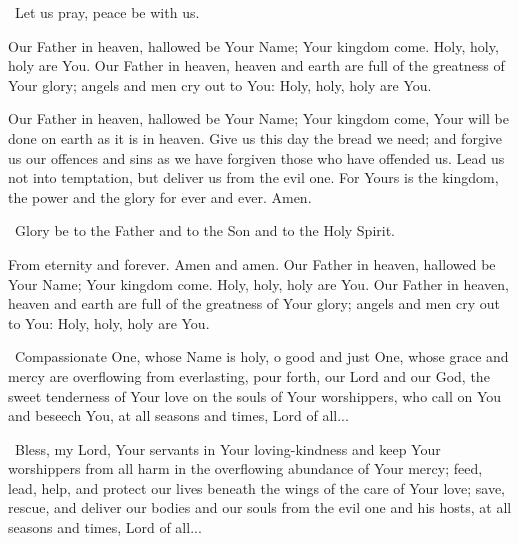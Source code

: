 \documentclass[12pt,twoside,a5paper]{article}
\begin{document}
\begin{halfparskip}
  \rr~Let us pray, peace be with us.


  Our Father in heaven, hallowed be Your Name; Your kingdom come. Holy, holy, holy are You. Our Father in heaven, heaven and earth are full of the greatness of Your glory; angels and men cry out to You: Holy, holy, holy are You.

  Our Father in heaven, hallowed be Your Name; Your kingdom come, Your will be done on earth as it is in heaven. Give us this day the bread we need; and forgive us our offences and sins as we have forgiven those who have offended us. Lead us not into temptation, but deliver us from the evil one. For Yours is the kingdom, the power and the glory for ever and ever. Amen.

  \cc~Glory be to the Father and to the Son and to the Holy Spirit.

  From eternity and forever. Amen and amen. Our Father in heaven, hallowed be Your Name; Your kingdom come. Holy, holy, holy are You. Our Father in heaven, heaven and earth are full of the greatness of Your glory; angels and men cry out to You: Holy, holy, holy are You.

  \cc~Compassionate One, whose Name is holy, o good and just One, whose grace and mercy are overflowing from everlasting, pour forth, our Lord and our God, the sweet tenderness of Your love on the souls of Your worshippers, who call on You and beseech You, at all seasons and times, Lord of all...

  \cc~Bless, my Lord, Your servants in Your loving-kindness and keep Your worshippers from all harm in the overflowing abundance of Your mercy; feed, lead, help, and protect our lives beneath the wings of the care of Your love; save, rescue, and deliver our bodies and our souls from the evil one and his hosts, at all seasons and times, Lord of all...
\end{halfparskip}



\end{document}
